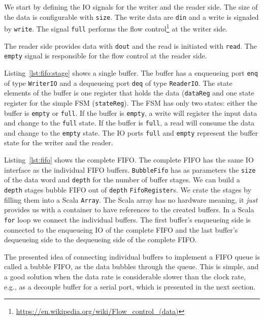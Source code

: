 \documentclass[%
    10pt,
    headinclude, footexclude,
    openright, %
    notitlepage,
    cleardoubleempty,
    headsepline,
    pointlessnumbers,
    bibtotoc, idxtotoc,
    ]{scrbook}
\newcommand{\code}[1]{{\small{\texttt{#1}}}}
\newcommand{\myref}[2]{\href{#1}{#2}}
\renewcommand{\myref}[2]{{#2}{\footnote{\url{#1}}}}
\begin{document}
We start by defining the IO signals for the writer and the reader side.
The size of the data is configurable with \code{size}.
The write data are \code{din} and a write is signaled by \code{write}.
The signal \code{full} performs the
\myref{https://en.wikipedia.org/wiki/Flow_control_(data)}{flow control}
at the writer side.


The reader side provides data with \code{dout} and the read is initiated
with \code{read}. The \code{empty} signal is responsible for the flow control
at the reader side.


Listing~\ref{lst:fifo:stage} shows a single buffer. The buffer has a enqueueing port
\code{enq} of type \code{WriterIO} and a dequeueing port \code{deq} of type
\code{ReaderIO}. The state elements of the buffer is one register that holds the
data (\code{dataReg} and one state register for the simple FSM (\code{stateReg}).
The FSM has only two states: either the buffer is \code{empty} or \code{full}.
If the buffer is \code{empty}, a write will register the input data and change
to the \code{full} state.
If the buffer is \code{full}, a read will consume the data and change to the
\code{empty} state.
The IO ports \code{full} and \code{empty} represent the buffer state for
the writer and the reader.


Listing~\ref{lst:fifo} shows the complete FIFO. The complete FIFO has
the same IO interface as the individual FIFO buffers.
\code{BubbleFifo} has as parameters the \code{size} of the data
word and \code{depth} for the number of buffer stages.
We can build a \code{depth} stages bubble FIFO out of \code{depth}
\code{FifoRegister}s. We crate the stages by filling them into a Scala \code{Array}.
The Scala array has no hardware meaning, it \emph{just} provides us with
a container to have references to the created buffers.
In a Scala \code{for} loop we connect the individual buffers.
The first buffer's enqueueing side is connected to the enqueueing IO of
the complete FIFO and the last buffer's dequeueing side to the
dequeueing side of the complete FIFO.


The presented idea of connecting individual buffers to implement a FIFO
queue is called a bubble FIFO, as the data bubbles through the queue.
This is simple, and a good solution when the data rate is considerable slower
than the clock rate, e.g., as a decouple buffer for a serial port, which is presented
in the next section.
\end{document}
